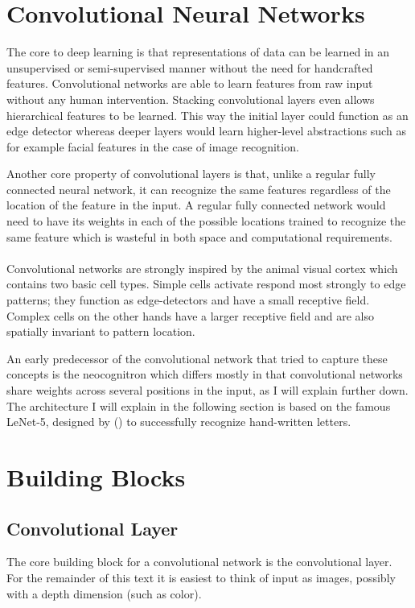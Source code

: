 \section{Convolutional Neural Networks}
\label{sec:cnn}
The core to deep learning is that representations
of data can be learned in an unsupervised
or semi-supervised manner
without the need for handcrafted features.
Convolutional networks are able to learn features
from raw input without any human intervention.
Stacking convolutional layers even allows
hierarchical features to be learned.
This way the initial layer could function
as an edge detector
whereas deeper layers
would learn higher-level abstractions
such as for example facial features
in the case of image recognition.

Another core property of convolutional layers is that,
unlike a regular fully connected neural network,
it can recognize the same features
regardless of the location of the feature in the input.
A regular fully connected network would need to have
its weights in each of the possible locations trained to recognize the same feature
which is wasteful in both space and computational requirements.

\paragraph{}
Convolutional networks are strongly inspired
by the animal visual cortex which contains two basic cell types.
Simple cells activate respond most strongly to edge patterns;
they function as edge-detectors and have a small receptive field.
Complex cells on the other hands have a larger receptive field
and are also spatially invariant to pattern location.

An early predecessor of the convolutional network
that tried to capture these concepts
is the neocognitron
\parencite{Fukushima1980}
which differs mostly in that convolutional networks
share weights across several positions in the input,
as I will explain further down.
The architecture I will explain in the following section
is based on the famous LeNet-5,
designed by
\citeauthor{LeCun1998}
(\citeyear{LeCun1998})
to successfully recognize hand-written letters.

\section{Building Blocks}
\label{sec:building_blocks}

\subsection{Convolutional Layer}
The core building block for a convolutional network
is the convolutional layer.
For the remainder of this text it is easiest
to think of input as images, possibly
with a depth dimension (such as color).

